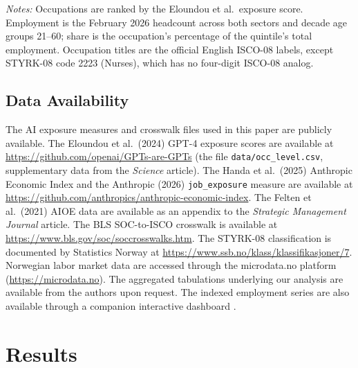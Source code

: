 \documentclass[12pt]{article}
\begin{document}
\begin{table}[htbp]
\centering
\caption{Five largest occupations by AI-exposure quintile, February 2026.}
\label{tab:quintile_top_occ}
\footnotesize

\begin{minipage}{\textwidth}\footnotesize\textit{Notes:} Occupations are ranked by the Eloundou et al.\ exposure score. Employment is the February 2026 headcount across both sectors and decade age groups 21--60; share is the occupation's percentage of the quintile's total employment. Occupation titles are the official English ISCO-08 labels, except STYRK-08 code 2223 (Nurses), which has no four-digit ISCO-08 analog.\end{minipage}
\end{table}

\subsection*{Data Availability}

The AI exposure measures and crosswalk files used in this paper are publicly available. The Eloundou et al.\ (2024) GPT-4 exposure scores are available at \url{https://github.com/openai/GPTs-are-GPTs} (the file \texttt{data/occ\_level.csv}, supplementary data from the \textit{Science} article). The Handa et al.\ (2025) Anthropic Economic Index and the Anthropic (2026) \texttt{job\_exposure} measure are available at \url{https://github.com/anthropics/anthropic-economic-index}. The Felten et al.\ (2021) AIOE data are available as an appendix to the \textit{Strategic Management Journal} article. The BLS SOC-to-ISCO crosswalk is available at \url{https://www.bls.gov/soc/soccrosswalks.htm}. The STYRK-08 classification is documented by Statistics Norway at \url{https://www.ssb.no/klass/klassifikasjoner/7}. Norwegian labor market data are accessed through the microdata.no platform (\url{https://microdata.no}). The aggregated tabulations underlying our analysis are available from the authors upon request. The indexed employment series are also available through a companion interactive dashboard \citep{kiindeksen2026}.




\section{Results}\label{sec:results}
\end{document}
